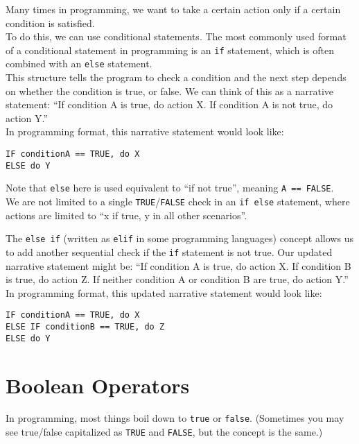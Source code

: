 \documentclass[
]{book}
\begin{document}
Many times in programming, we want to take a certain action only if a certain condition is satisfied.\\

To do this, we can use conditional statements. The most commonly used format of a conditional statement in programming is an \texttt{if} statement, which is often combined with an \texttt{else} statement.\\

This structure tells the program to check a condition and the next step depends on whether the condition is true, or false. We can think of this as a narrative statement: ``If condition A is true, do action X. If condition A is not true, do action Y.''\\

In programming format, this narrative statement would look like:

\begin{verbatim}
IF conditionA == TRUE, do X
ELSE do Y
\end{verbatim}

Note that \texttt{else} here is used equivalent to ``if not true'', meaning \texttt{A\ ==\ FALSE}.\\

We are not limited to a single \texttt{TRUE}/\texttt{FALSE} check in an \texttt{if\ else} statement, where actions are limited to ``x if true, y in all other scenarios''.

The \texttt{else\ if} (written as \texttt{elif} in some programming languages) concept allows us to add another sequential check if the \texttt{if} statement is not true. Our updated narrative statement might be: ``If condition A is true, do action X. If condition B is true, do action Z. If neither condition A or condition B are true, do action Y.''\\

In programming format, this updated narrative statement would look like:

\begin{verbatim}
IF conditionA == TRUE, do X
ELSE IF conditionB == TRUE, do Z
ELSE do Y
\end{verbatim}

\section{Boolean Operators}\label{boolean-operators}

In programming, most things boil down to \texttt{true} or \texttt{false}. (Sometimes you may see true/false capitalized as \texttt{TRUE} and \texttt{FALSE}, but the concept is the same.)\\
\end{document}
